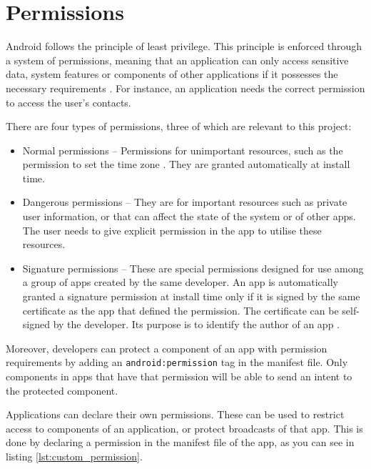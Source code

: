     \section{Permissions}
        \label{sec:permissions}
        
    Android follows the principle of least privilege. This principle is enforced through a system of permissions, meaning that an application can only access sensitive data, system features or components of other applications if it possesses the necessary requirements \cite{permissions_guide}. For instance, an application needs the correct permission to access the user’s contacts. 
        
    There are four types of permissions, three of which are relevant to this project:
    
    \begin{itemize}
        \item Normal permissions – Permissions for unimportant resources, such as the permission to set the time zone \cite{permissions_guide}. They are granted automatically at install time.
        \item Dangerous permissions – They are for important resources such as private user information, or that can affect the state of the system or of other apps. The user needs to give explicit permission in the app to utilise these resources.
        \item Signature permissions – These are special permissions designed for use among a group of apps created by the same developer. An app is automatically granted a signature permission at install time only if it is signed by the same certificate as the app that defined the permission. The certificate can be self-signed by the developer. Its purpose is to identify the author of an app \cite{define_custom_permission}.
    \end{itemize}
    
    Moreover, developers can protect a component of an app with permission requirements by adding an \lstinline|android:permission| tag in the manifest file. Only components in apps that have that permission will be able to send an intent to the protected component.
        
    Applications can declare their own permissions. These can be used to restrict access to components of an application, or protect broadcasts of that app. This is done by declaring a permission in the manifest file of the app, as you can see in listing \ref{lst:custom_permission}.
    
